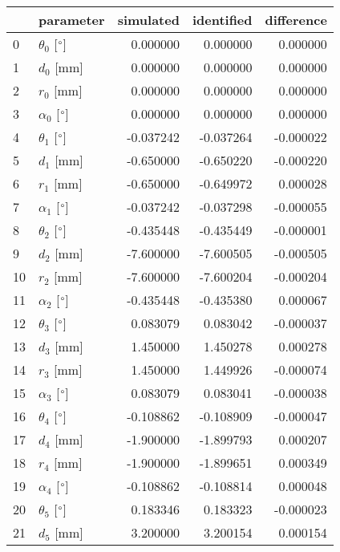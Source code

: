 \documentclass{standalone}%
\begin{document}
%
\normalsize%
\begin{tabular}{llrrr}
\toprule
{} &                 parameter & simulated & identified & difference \\
\midrule
0  &  $\theta_{0}$ [$\degree$] &  0.000000 &   0.000000 &   0.000000 \\
1  &              $d_{0}$ [mm] &  0.000000 &   0.000000 &   0.000000 \\
2  &              $r_{0}$ [mm] &  0.000000 &   0.000000 &   0.000000 \\
3  &  $\alpha_{0}$ [$\degree$] &  0.000000 &   0.000000 &   0.000000 \\
4  &  $\theta_{1}$ [$\degree$] & -0.037242 &  -0.037264 &  -0.000022 \\
5  &              $d_{1}$ [mm] & -0.650000 &  -0.650220 &  -0.000220 \\
6  &              $r_{1}$ [mm] & -0.650000 &  -0.649972 &   0.000028 \\
7  &  $\alpha_{1}$ [$\degree$] & -0.037242 &  -0.037298 &  -0.000055 \\
8  &  $\theta_{2}$ [$\degree$] & -0.435448 &  -0.435449 &  -0.000001 \\
9  &              $d_{2}$ [mm] & -7.600000 &  -7.600505 &  -0.000505 \\
10 &              $r_{2}$ [mm] & -7.600000 &  -7.600204 &  -0.000204 \\
11 &  $\alpha_{2}$ [$\degree$] & -0.435448 &  -0.435380 &   0.000067 \\
12 &  $\theta_{3}$ [$\degree$] &  0.083079 &   0.083042 &  -0.000037 \\
13 &              $d_{3}$ [mm] &  1.450000 &   1.450278 &   0.000278 \\
14 &              $r_{3}$ [mm] &  1.450000 &   1.449926 &  -0.000074 \\
15 &  $\alpha_{3}$ [$\degree$] &  0.083079 &   0.083041 &  -0.000038 \\
16 &  $\theta_{4}$ [$\degree$] & -0.108862 &  -0.108909 &  -0.000047 \\
17 &              $d_{4}$ [mm] & -1.900000 &  -1.899793 &   0.000207 \\
18 &              $r_{4}$ [mm] & -1.900000 &  -1.899651 &   0.000349 \\
19 &  $\alpha_{4}$ [$\degree$] & -0.108862 &  -0.108814 &   0.000048 \\
20 &  $\theta_{5}$ [$\degree$] &  0.183346 &   0.183323 &  -0.000023 \\
21 &              $d_{5}$ [mm] &  3.200000 &   3.200154 &   0.000154 \\

\end{tabular}
\end{document}
